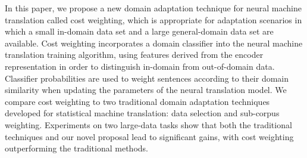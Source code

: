 In this paper, we propose a new domain adaptation technique for neural machine translation called cost weighting, which is appropriate for adaptation scenarios in which a small in-domain data set and a large general-domain data set are available. Cost weighting incorporates a domain classifier into the neural machine translation training algorithm, using features derived from the encoder representation in order to distinguish in-domain from out-of-domain data. Classifier probabilities are used to weight sentences according to their domain similarity when updating the parameters of the neural translation model. We compare cost weighting to two traditional domain adaptation techniques developed for statistical machine translation: data selection and sub-corpus weighting. Experiments on two large-data tasks show that both the traditional techniques and our novel proposal lead to significant gains, with cost weighting outperforming the traditional methods.
